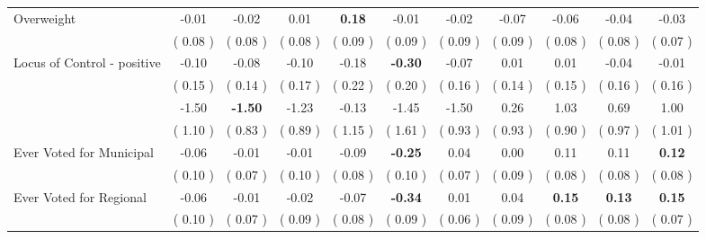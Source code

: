 \begin{tabular}{l c c c c c c c c c c}
Overweight &     -0.01 &     -0.02 &      0.01 & \textbf{      0.18 } &     -0.01 &     -0.02 &     -0.07 &     -0.06 &     -0.04 &     -0.03 \\
& (     0.08 ) & (     0.08 ) & (     0.08 ) & (     0.09 ) & (     0.09 ) & (     0.09 ) & (     0.09 ) & (     0.08 ) & (     0.08 ) & (     0.07 ) \\
Locus of Control - positive &     -0.10 &     -0.08 &     -0.10 &     -0.18 & \textbf{     -0.30 } &     -0.07 &      0.01 &      0.01 &     -0.04 &     -0.01 \\
& (     0.15 ) & (     0.14 ) & (     0.17 ) & (     0.22 ) & (     0.20 ) & (     0.16 ) & (     0.14 ) & (     0.15 ) & (     0.16 ) & (     0.16 ) \\
&     -1.50 & \textbf{     -1.50 } &     -1.23 &     -0.13 &     -1.45 &     -1.50 &      0.26 &      1.03 &      0.69 &      1.00 \\
& (     1.10 ) & (     0.83 ) & (     0.89 ) & (     1.15 ) & (     1.61 ) & (     0.93 ) & (     0.93 ) & (     0.90 ) & (     0.97 ) & (     1.01 ) \\
Ever Voted for Municipal &     -0.06 &     -0.01 &     -0.01 &     -0.09 & \textbf{     -0.25 } &      0.04 &      0.00 &      0.11 &      0.11 & \textbf{     0.12} \\
& (     0.10 ) & (     0.07 ) & (     0.10 ) & (     0.08 ) & (     0.10 ) & (     0.07 ) & (     0.09 ) & (     0.08 ) & (     0.08 ) & (     0.08 ) \\
Ever Voted for Regional &     -0.06 &     -0.01 &     -0.02 &     -0.07 & \textbf{     -0.34 } &      0.01 &      0.04 & \textbf{      0.15 } & \textbf{      0.13 } & \textbf{     0.15} \\
& (     0.10 ) & (     0.07 ) & (     0.09 ) & (     0.08 ) & (     0.09 ) & (     0.06 ) & (     0.09 ) & (     0.08 ) & (     0.08 ) & (     0.07 ) \\
\bottomrule
\end{tabular}
